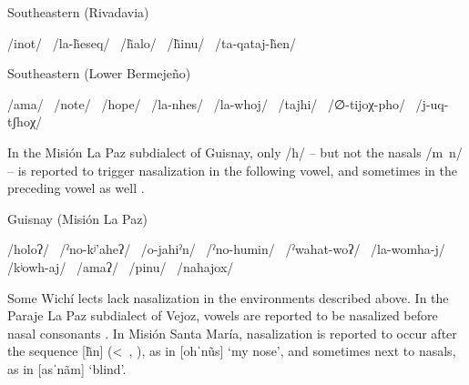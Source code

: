 \newpage
\ea
Southeastern (Rivadavia) \citep[78–79]{JT09-cap}\\
    \begin{xlist}
        \ex /inot/~
        \ex /la-h̃eseq/~
        \ex /h̃alo/~
        \ex /h̃inu/~
        \ex /ta-qataj-h̃en/~
    \end{xlist}
\z

\ea
Southeastern (Lower Bermejeño) \citep[42]{VN14}\\
    \begin{xlist}
        \ex /ama/~
        \ex /note/~
        \ex /hope/~
        \ex /la-nhes/~
        \ex /la-whoj/~
        \ex /tajhi/~
        \ex /∅-tijoχ-pho/~
        \ex /j-uq-tʃhoχ/~
    \end{xlist}
\z

In the Misión La Paz subdialect of Guisnay, only /h/ -- but not the nasals /m~n/ -- is reported to trigger nasalization in the following vowel, and sometimes in the preceding vowel as well \citep[69–71, 83–84]{MA08}.

\ea
Guisnay (Misión La Paz) \citep[46–47, 70–71, 92]{MA08}\\
    \begin{xlist}
        \ex /holoʔ/~
        \ex /ˀno-kʲ’aheʔ/~
        \ex /o-jahiˀn/~
        \ex /ˀno-humin/~
        \ex /ˀwahat-woʔ/~
        \ex /la-womha-j/~
        \ex /kʲowh-aj/~
        \ex /amaʔ/~
        \ex /pinu/~
        \ex /nahajox/~
    \end{xlist}
\z
{}

Some Wichí lects lack nasalization in the environments described above. In the Paraje La Paz subdialect of Vejoz, vowels are reported to be nasalized before nasal consonants \citep{AFG067}. In Misión Santa María, nasalization is reported to occur after the sequence [h̃n] (<~, ), as in [ohˈnũs] `my nose', and sometimes next to nasals, as in [asˈnãm] `blind'.

